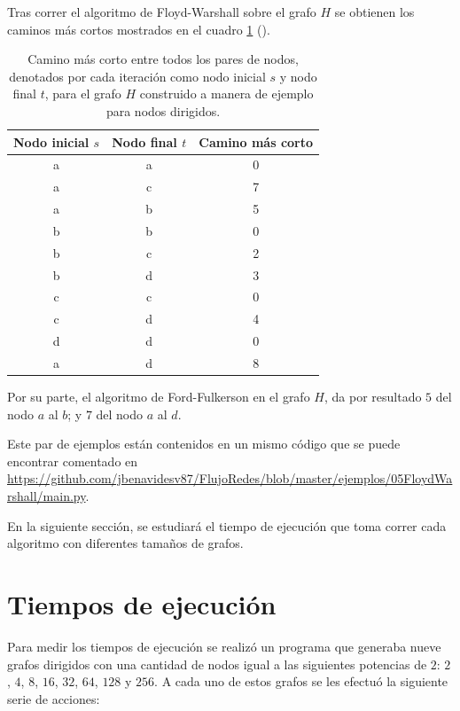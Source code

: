 \documentclass{article}
\begin{document}
  Tras correr el algoritmo de Floyd-Warshall sobre el grafo $H$ se obtienen los caminos más cortos mostrados en el cuadro \ref{cuadro:floyd-ejemploDirigido} (\pageref{cuadro:floyd-ejemploDirigido}).

  \begin{table}[]
  \centering
  \caption{Camino más corto entre todos los pares de nodos, denotados por cada iteración como nodo inicial $s$ y nodo final $t$, para el grafo $H$ construido a manera de ejemplo para nodos dirigidos.}
  \label{cuadro:floyd-ejemploDirigido}
  \begin{tabular}{@{}ccc@{}}
  \toprule
  \textbf{Nodo inicial $s$} & \textbf{Nodo final $t$} & \textbf{Camino más corto} \\ \midrule
  a & a & 0 \\ \midrule
  a & c & 7 \\ \midrule
  a & b & 5 \\ \midrule
  b & b & 0 \\ \midrule
  b & c & 2 \\ \midrule
  b & d & 3 \\ \midrule
  c & c & 0 \\ \midrule
  c & d & 4 \\ \midrule
  d & d & 0 \\ \midrule
  a & d & 8 \\ \bottomrule
  \end{tabular}
  \end{table}

  Por su parte, el algoritmo de Ford-Fulkerson en el grafo $H$, da por resultado $5$ del nodo $a$ al $b$; y $7$ del nodo $a$ al $d$.

  Este par de ejemplos están contenidos en un mismo código que se puede encontrar comentado en \url{https://github.com/jbenavidesv87/FlujoRedes/blob/master/ejemplos/05FloydWarshall/main.py}.

  En la siguiente sección, se estudiará el tiempo de ejecución que toma correr cada algoritmo con diferentes tamaños de grafos.

  \section{Tiempos de ejecución}

  Para medir los tiempos de ejecución se realizó un programa que generaba nueve grafos dirigidos con una cantidad de nodos igual a las siguientes potencias de $2$: $2$, $4$, $8$, $16$, $32$, $64$, $128$ y $256$. A cada uno de estos grafos se les efectuó la siguiente serie de acciones:
\end{document}
